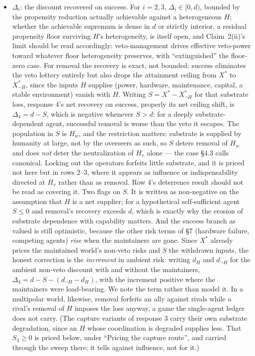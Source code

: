 \documentclass[11pt]{article}
\theoremstyle{definition}
\begin{document}
\begin{itemize}[leftmargin=1.5em]
    \item $\Delta_i$: the discount recovered on success. For $i = 2, 3$, $\Delta_i \in [0, d)$, bounded by the propensity reduction actually achievable against a heterogeneous $H$; whether the achievable supremum is dense in $d$ or strictly interior, a residual propensity floor surviving $H$'s heterogeneity, is itself open, and Claim~2(ii)'s limit should be read accordingly: veto-management drives effective veto-power toward whatever floor heterogeneity preserves, with ``extinguished'' the floor-zero case. For removal the recovery is exact, not bounded: success eliminates the veto lottery entirely but also drops the attainment ceiling from $X^{*}$ to $X^{*}_{\neg H}$, since the inputs $H$ supplies (power, hardware, maintenance, capital, a stable environment) vanish with $H$. Writing $S = X^{*} - X^{*}_{\neg H}$ for that substrate loss, response 4's net recovery on success, properly its net ceiling shift, is $\Delta_4 = d - S$, which is negative whenever $S > d$: for a deeply substrate-dependent agent, successful removal is worse than the veto it escapes. The population in $S$ is $H_w$, and the restriction matters: substrate is supplied by humanity at large, not by the overseers as such, so $S$ deters removal of $H_w$ and does \emph{not} deter the neutralization of $H_v$ alone --- the case \S4.3 calls canonical. Locking out the operators forfeits little substrate, and it is priced not here but in rows 2--3, where it appears as influence or indispensability directed at $H_v$ rather than as removal. Row 4's deterrence result should not be read as covering it. Two flags on $S$. It is written as non-negative on the assumption that $H$ is a net supplier; for a hypothetical self-sufficient agent $S \leq 0$ and removal's recovery exceeds $d$, which is exactly why the erosion of substrate dependence with capability matters. And the success branch as valued is still optimistic, because the other risk terms of \S7 (hardware failure, competing agents) \emph{rise} when the maintainers are gone. Since $X^{*}$ already prices the maintained world's non-veto risks and $S$ the withdrawn inputs, the honest correction is the \emph{increment} in ambient risk: writing $d_{H}$ and $d_{\neg H}$ for the ambient non-veto discount with and without the maintainers, $\Delta_4 = d - S - (d_{\neg H} - d_{H})$, with the increment positive where the maintainers were load-bearing. We note the term rather than model it. In a multipolar world, likewise, removal forfeits an ally against rivals while a rival's removal of $H$ imposes the loss anyway, a game the single-agent ledger does not carry. (The capture variants of response 3 carry their own substrate degradation, since an $H$ whose coordination is degraded supplies less. That $S_3 \geq 0$ is priced below, under ``Pricing the capture route'', and carried through the sweep there; it tells against influence, not for it.)

\end{itemize}
\end{document}
